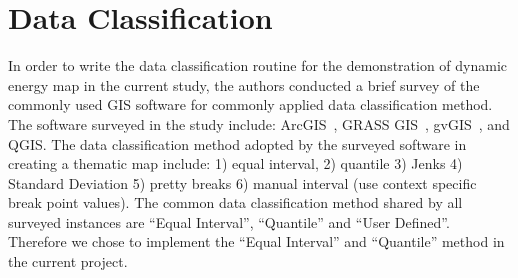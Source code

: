 \begin{comment}
\subsection{Spatial Temporal Data Analysis}\label{stDataAnalysis}
In order to better utilize the power of Dynamic Maps, one has to
understand the special features of spactial-temporal data and the
methods of how to use spactial-temporal data. This leads to the
literature study of the following section of spatial temporal data
analysis.

One temptation of analyzing spatial-temporal data is to aggregate them
into ``time periods'' and ``zonal entities'' and then use the static
analysis method to analyze the aggregated data~\cite{Dorling1992}. The
problem of this approach is 1) it increases the sensitivity
(i.e. minor changes in input causes dramatic changes in output) and 2)
it removes the ``dynamic'' feature of a dynamic.
map~\cite{Dorling1992}.

One layer of the goal of a space-time map is to make ``complex dynamic
process'' visible, in the hope of letting observers comprehend the
dynamics of data presented and to gain a general insight. Baring this
goal in mind, Dorling and Openshaw suggested a noise removal or data
smoothing in both the time and space dimension before the actual map
creation~\cite{Dorling1992}.
\end{comment}

\section{Data Classification}\label{dataClassification}
In order to write the data classification routine for the
demonstration of dynamic energy map in the current study, the authors
conducted a brief survey of the commonly used GIS software for
commonly applied data classification method. The software surveyed in
the study include: ArcGIS~\cite{GIS_Jenks2014}, GRASS
GIS~\cite{GRASSGIS2008}, gvGIS~\cite{gvGIS2011}, and QGIS. The data
classification method adopted by the surveyed software in creating a
thematic map include: 1) equal interval, 2) quantile 3) Jenks 4)
Standard Deviation 5) pretty breaks 6) manual interval (use context
specific break point values). The common data classification method
shared by all surveyed instances are ``Equal Interval'', ``Quantile''
and ``User Defined''. Therefore we chose to implement the ``Equal
Interval'' and ``Quantile'' method in the current project.

